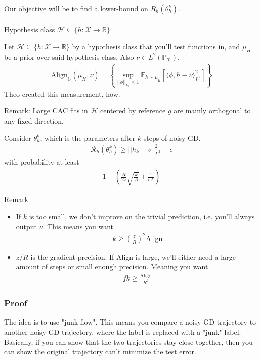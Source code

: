 Our objective will be to find a lower-bound on $R_h(\theta_h^k)$.\\
\\
Hypothesis class $\mathcal H\subseteq \{h : \mathcal X \to \mathbb R\}$
\begin{definition}
	 Let $\mathcal H\subseteq \{h : \mathcal X \to \mathbb R\}$ by a hypothesis class that you'll test functions in, and $\mu_H$ be a prior over said hypothesis class. Also $\nu \in L^2(\mathbb P_{\mathcal X})$.
	\begin{align}
		\text{Align}_C(\mu_H, \nu) = \left\{\sup_{||\phi||_{L_2} \leq 1}\mathbb E_{h \sim \mu_H}[\langle \phi, h-\nu\rangle_{L^2}^2] \right\}
	\end{align}
	Theo created this measurement, how.
\end{definition}
Remark: Large CAC fits in $\mathcal H$ centered by reference $g$ are mainly orthogonal to any fixed direction.

\begin{theorem}
	Consider $\theta_h^k$, which is the parameters after $k$ steps of noisy GD.
	\begin{align}
		\mathcal R_h (\theta_h^k) \geq ||h_k - v||_{L^2}^2  - \epsilon
	\end{align}
	with probability at least
	\begin{align}
		1 - \left ( \frac{R}{2z} \sqrt{\frac{k}{A}} + \frac{1}{\epsilon A} \right) 
	\end{align}
\end{theorem}
Remark
\begin{itemize}
	\item If $k$ is too small, we don't improve on the trivial prediction, i.e. you'll always output $\nu$. This means you want
	\begin{align}
		k \geqslant \left (\frac{z}{R}\right)^2 \text{Align}
	\end{align}
	\item $z/R$ is the gradient precision. If Align is large, we'll either need a large amount of steps or small enough precision. Meaning you want 
	\begin{align}
		fk \geqslant \frac{\text{Align}}{R^2}
	\end{align}
\end{itemize}
\subsubsection{Proof}
The idea is to use "junk flow". This means you compare a noisy GD trajectory to another noisy GD trajectory, where the label is replaced with a "junk" label. Basically, if you can show that the two trajectories stay close together, then you can show the original trajectory can't minimize the test error.

